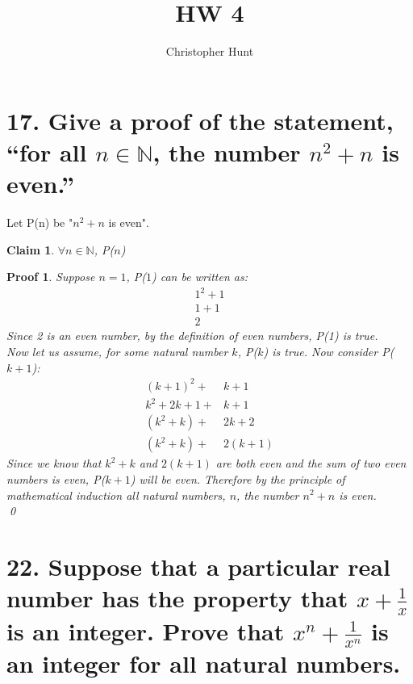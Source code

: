 \documentclass[11pt]{article}
\title{HW 4}
\author{Christopher Hunt}
\date{}
\newtheorem*{claim}{Claim}
\newtheorem*{poof}{Proof}
\begin{document}
\pagestyle{fancy}
\fancyhf{}
\rhead{\thepage}

\maketitle

\section*{17. Give a proof of the statement, “for all $n\in \mathbb{N}$, the number $n^2+n$ is even.”}
Let P(n) be "$n^2 + n$ is even".
\begin{claim}
    $\forall n \in \mathbb{N}$, P($n$)
\end{claim}
\begin{poof}
    Suppose  $n=1$, P($1$) can be written as:
    \begin{align*}
        1^2+1\\
        1+1\\
        2
    \end{align*}
    Since 2 is an even number, by the definition of even numbers, P(1) is true.\\
    
    \noindent Now let us assume, for some natural number $k$, P($k$) is true.
    Now consider P($k+1$):
    \begin{align*}
        (k+1)^2+&k+1\\
        k^2+2k+1+&k+1\\
        (k^2+k)+&2k+2\\
        (k^2+k)+&2(k+1)
    \end{align*}
    Since we know that $k^2+k$ and $2(k+1)$ are both even and the sum of two even numbers is even, P($k+1$) will be even.
    Therefore by the principle of mathematical induction all natural numbers, $n$, the number $n^2+n$ is even.
    \\
    \qed
\end{poof}
\newpage
\section*{22. Suppose that a particular real number 
 has the property that $x+\frac{1}{x}$ is an integer. Prove that $x^n+\frac{1}{x^n}$ is an integer for all natural numbers.}
\end{document}
